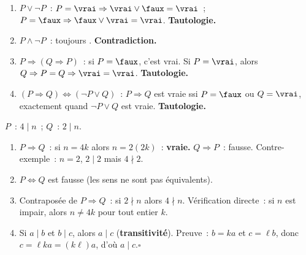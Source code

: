 
\begin{enumerate}
  \item $P\lor\lnot P$~: $P=\vrai\Rightarrow\vrai\lor\faux=\vrai$~;
        $P=\faux\Rightarrow\faux\lor\vrai=\vrai$. \textbf{Tautologie.}
  \item $P\land\lnot P$~: toujours \faux. \textbf{Contradiction.}
  \item $P\Rightarrow(Q\Rightarrow P)$~: si $P=\faux$, c'est vrai.
        Si $P=\vrai$, alors $Q\Rightarrow P=Q\Rightarrow\vrai=\vrai$.
        \textbf{Tautologie.}
  \item $(P\Rightarrow Q)\Leftrightarrow(\lnot P\lor Q)$~:
        $P\Rightarrow Q$ est vraie ssi $P=\faux$ ou $Q=\vrai$,
        exactement quand $\lnot P\lor Q$ est vraie. \textbf{Tautologie.}
\end{enumerate}


$P$~: $4\mid n$~; $Q$~: $2\mid n$.

\begin{enumerate}
  \item $P\Rightarrow Q$~: si $n=4k$ alors $n=2(2k)$~: \textbf{vraie.}
        $Q\Rightarrow P$~: fausse. Contre-exemple~: $n=2$, $2\mid2$ mais $4\nmid2$.
  \item $P\Leftrightarrow Q$ est fausse (les sens ne sont pas \'equivalents).
  \item Contrapos\'ee de $P\Rightarrow Q$~: si $2\nmid n$ alors $4\nmid n$.
        V\'erification directe~: si $n$ est impair, alors $n\ne4k$ pour tout entier $k$.
  \item Si $a\mid b$ et $b\mid c$, alors $a\mid c$ (\textbf{transitivit\'e}).
        Preuve~: $b=ka$ et $c=\ell b$, donc $c=\ell ka=(k\ell)a$, d'o\`u $a\mid c$.\hfill$\square$
\end{enumerate}


